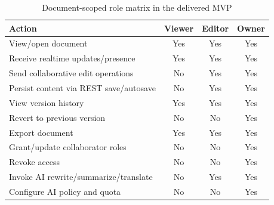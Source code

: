 \begin{table}[H]
\centering
\caption{Document-scoped role matrix in the delivered MVP}
\label{tab:role-matrix}
\begin{tabularx}{\textwidth}{>{\raggedright\arraybackslash}X c c c}
\toprule
\textbf{Action} & \textbf{Viewer} & \textbf{Editor} & \textbf{Owner} \\
\midrule
View/open document & Yes & Yes & Yes \\
Receive realtime updates/presence & Yes & Yes & Yes \\
Send collaborative edit operations & No & Yes & Yes \\
Persist content via REST save/autosave & No & Yes & Yes \\
View version history & Yes & Yes & Yes \\
Revert to previous version & No & No & Yes \\
Export document & Yes & Yes & Yes \\
Grant/update collaborator roles & No & No & Yes \\
Revoke access & No & No & Yes \\
Invoke AI rewrite/summarize/translate & No & Yes & Yes \\
Configure AI policy and quota & No & No & Yes \\
\bottomrule
\end{tabularx}
\end{table}

